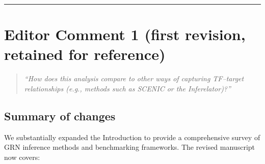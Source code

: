 \documentclass[11pt,letterpaper]{article}
\begin{document}
\bigskip
\noindent\rule{\textwidth}{0.4pt}
\bigskip

\section*{Editor Comment 1 (first revision, retained for reference)}

\begin{quote}
\textit{``How does this analysis compare to other ways of capturing
TF--target relationships (e.g., methods such as SCENIC or the
Inferelator)?''}
\end{quote}

\subsection*{Summary of changes}

We substantially expanded the Introduction to provide a comprehensive
survey of GRN inference methods and benchmarking frameworks. The revised
manuscript now covers:
\end{document}
